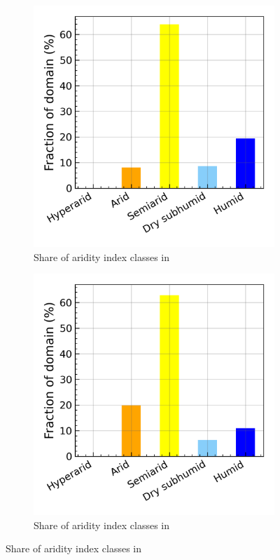 \begin{figure}[htbp]
    \begin{subfigure}[b]{0.31\textwidth}
        \caption{Share of aridity index classes in \presnoirr}
        \includegraphics[width=\textwidth]{images/chap4/future/aridity_index_distribution_pres_noirr.png}
    \end{subfigure}
    \begin{subfigure}[b]{0.31\textwidth}
        \caption{Share of aridity index classes in \futnoirr}
        \includegraphics[width=\textwidth]{images/chap4/future/aridity_index_distribution_fut_noirr.png}

\end{subfigure}
\end{figure}
